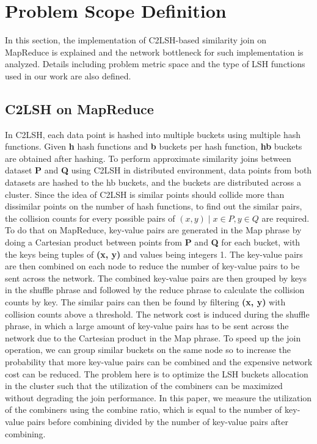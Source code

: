 \documentclass{vldb}
\begin{document}
\section{Problem Scope Definition}
In this section, the implementation of C2LSH-based similarity join on MapReduce is explained and the network bottleneck for such implementation is analyzed. Details including problem metric space and the type of LSH functions used in our work are also defined.

\subsection{C2LSH on MapReduce}
In C2LSH, each data point is hashed into multiple buckets using multiple hash functions. Given \textbf{h} hash functions and \textbf{b} buckets per hash function, \textbf{hb} buckets are obtained after hashing. To perform approximate similarity joins between dataset \textbf{P} and \textbf{Q} using C2LSH in distributed environment, data points from both datasets are hashed to the hb buckets, and the buckets are distributed across a cluster.
Since the idea of C2LSH is similar points should collide more than dissimilar points on the number of hash functions, to find out the similar pairs, the collision counts for every possible pairs of $(x, y) \mid x \in P, y \in Q$ are required. To do that on MapReduce, key-value pairs are generated in the Map phrase by doing a Cartesian product between points from \textbf{P} and \textbf{Q} for each bucket, with the keys being tuples of \textbf{(x, y)} and values being integers 1. The key-value pairs are then combined on each node to reduce the number of key-value pairs to be sent across the network. The combined key-value pairs are then grouped by keys in the shuffle phrase and followed by the reduce phrase to calculate the collision counts by key. The similar pairs can then be found by filtering \textbf{(x, y)} with collision counts above a threshold.
The network cost is induced during the shuffle phrase, in which a large amount of key-value pairs has to be sent across the network due to the Cartesian product in the Map phrase. To speed up the join operation, we can group similar buckets on the same node so to increase the probability that more key-value pairs can be combined and the expensive network cost can be reduced. The problem here is to optimize the LSH buckets allocation in the cluster such that the utilization of the combiners can be maximized without degrading the join performance. In this paper, we measure the utilization of the combiners using the combine ratio, which is equal to the number of key-value pairs before combining divided by the number of key-value pairs after combining.
\end{document}
